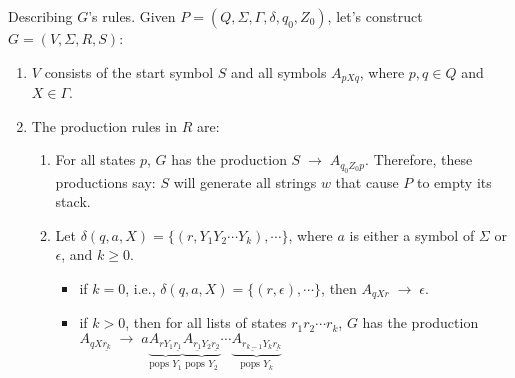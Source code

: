 \documentclass{prosper}%
\newcommand{\e} {{\mbox{$\epsilon$}}}
\newcommand{\ra}{\mbox{$\;\rightarrow\;$}}
\newcommand{\cvd}{\mbox{$\;\overset{*}{\vdash}\;$}}
\newcommand{\qed}{{$\;\;\Box$}}
\begin{document}
\begin{slide}{Describing $G$'s rules.}
Given $P=(Q, \Sigma, \Gamma, \delta, q_0, Z_0)$, let's construct $G=(V, \Sigma, R, S)$:
\begin{enumerate}
\item $V$ consists of the start symbol $S$ and all symbols $A_{pXq}$, where  $p,q\in Q$  and $X\in\Gamma$.
\item The production rules in $R$ are:
\begin{enumerate}
\item For all states $p$, $G$ has the production $S\ra A_{q_0Z_0p}$. Therefore, these productions say: $S$ will generate all strings $w$ that cause $P$ to empty its stack.
\item Let $\delta(q, a, X)=\{(r, Y_1Y_2\cdots Y_k),\cdots\}$, where $a$ is either a symbol of $\Sigma$ or \e, and $k\geq 0$.
\begin{itemize}
\item  if $k= 0$, i.e.,  $\delta(q,a,X)=\{(r,\e),\cdots\}$, then $A_{qXr}\ra \epsilon$.
\item if $k>0$, then for all lists of states $r_1r_2\cdots r_k$, $G$ has the production $A_{qX\underline{r_k}}\ra a \underbrace{A_{rY_1\underline{r_1}}}_{\mbox{pops $Y_1$}}\underbrace{A_{\underline{r_1}Y_2\underline{r_2}}}_{\mbox{pops $Y_2$}}\cdots \underbrace{A_{\underline{r_{k-1}}Y_k\underline{r_k}}}_{\mbox{pops $Y_k$}}$
\end{itemize}
\end{enumerate}
\end{enumerate}
\end{slide}

\end{document}
